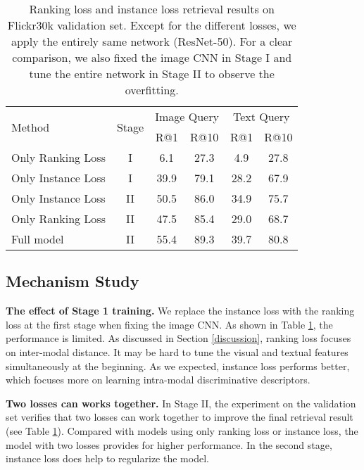 \documentclass[10pt,final,journal]{IEEEtran}
\begin{document}
\setlength{\tabcolsep}{6pt}
\begin{table}
\footnotesize
\begin{center}
\begin{tabular}{l|c|cc|cc}
\hline
\multirow{2}{*}{Method} & \multirow{2}{*}{Stage} & \multicolumn{2}{c|}{Image Query} & \multicolumn{2}{c}{Text Query}\\
  &  & R@1 & R@10 & R@1 & R@10\\
\shline
Only Ranking Loss & I & 6.1 & 27.3 & 4.9 & 27.8\\
Only Instance Loss &  I & 39.9 & 79.1 & 28.2 & 67.9 \\
\hline
Only Instance Loss &  II & 50.5 & 86.0 & 34.9 & 75.7 \\
Only Ranking Loss & II & 47.5 & 85.4 & 29.0 & 68.7 \\
Full model & II & 55.4 & 89.3 & 39.7 & 80.8 \\
\hline
\end{tabular}
\end{center}
\caption{Ranking loss and instance loss retrieval results on Flickr30k validation set. Except for the different losses, we apply the entirely same network (ResNet-50). For a clear comparison, we also fixed the image CNN in Stage I and tune the entire network in Stage II to observe the overfitting. }
\label{table:instance>Rank}
\end{table}





\subsection{Mechanism Study} \label{sec:study}
\textbf{The effect of Stage 1 training.} \label{stage1}
We replace the instance loss with the ranking loss at the first stage when fixing the image CNN. As shown in Table \ref{table:instance>Rank}, the performance is limited. As discussed in Section \ref{discussion}, ranking loss focuses on inter-modal distance. It may be hard to tune the visual and textual features simultaneously at the beginning. As we expected, instance loss performs better, which focuses more on learning intra-modal discriminative descriptors.

\textbf{Two losses can works together.} \label{stage2}
In Stage II, the experiment on the validation set verifies that two losses can work together to improve the final retrieval result (see Table \ref{table:instance>Rank}). Compared with models using only ranking loss or instance loss, the model with two losses provides for higher performance. In the second stage, instance loss does help to regularize the model.
\end{document}
